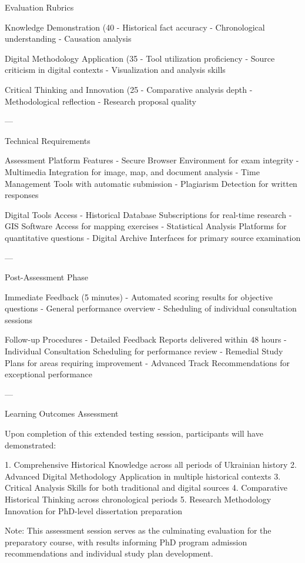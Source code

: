      Evaluation Rubrics 

 Knowledge Demonstration (40%
- Historical fact accuracy
- Chronological understanding
- Causation analysis

 Digital Methodology Application (35%
- Tool utilization proficiency
- Source criticism in digital contexts
- Visualization and analysis skills

 Critical Thinking and Innovation (25%
- Comparative analysis depth
- Methodological reflection
- Research proposal quality

---

    Technical Requirements 

     Assessment Platform Features 
-  Secure Browser Environment  for exam integrity
-  Multimedia Integration  for image, map, and document analysis
-  Time Management Tools  with automatic submission
-  Plagiarism Detection  for written responses

     Digital Tools Access 
-  Historical Database Subscriptions  for real-time research
-  GIS Software Access  for mapping exercises
-  Statistical Analysis Platforms  for quantitative questions
-  Digital Archive Interfaces  for primary source examination

---

    Post-Assessment Phase 

     Immediate Feedback (5 minutes) 
- Automated scoring results for objective questions
- General performance overview
- Scheduling of individual consultation sessions

     Follow-up Procedures 
-  Detailed Feedback Reports  delivered within 48 hours
-  Individual Consultation Scheduling  for performance review
-  Remedial Study Plans  for areas requiring improvement
-  Advanced Track Recommendations  for exceptional performance

---

    Learning Outcomes Assessment 

Upon completion of this extended testing session, participants will have demonstrated:

1.  Comprehensive Historical Knowledge  across all periods of Ukrainian history
2.  Advanced Digital Methodology Application  in multiple historical contexts
3.  Critical Analysis Skills  for both traditional and digital sources
4.  Comparative Historical Thinking  across chronological periods
5.  Research Methodology Innovation  for PhD-level dissertation preparation

 Note:  This assessment session serves as the culminating evaluation for the preparatory course, with results informing PhD program admission recommendations and individual study plan development.


